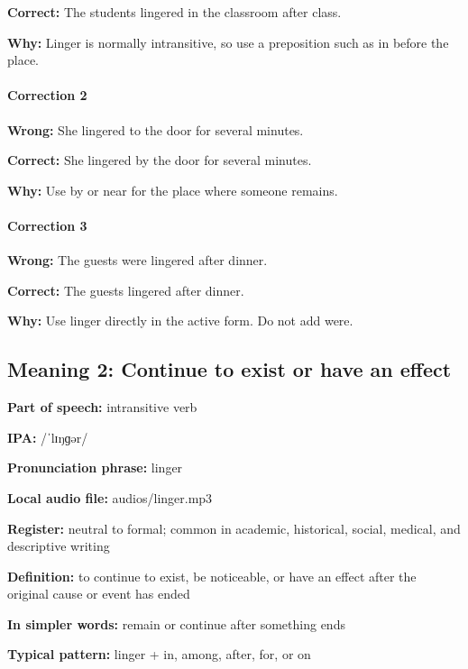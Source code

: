 \documentclass[11pt]{article}
\begin{document}
\textbf{Correct:} The students lingered in the classroom after class.

\textbf{Why:} Linger is normally intransitive, so use a preposition such as in before the place.

\paragraph{Correction 2}
\textbf{Wrong:} She lingered to the door for several minutes.

\textbf{Correct:} She lingered by the door for several minutes.

\textbf{Why:} Use by or near for the place where someone remains.

\paragraph{Correction 3}
\textbf{Wrong:} The guests were lingered after dinner.

\textbf{Correct:} The guests lingered after dinner.

\textbf{Why:} Use linger directly in the active form. Do not add were.

\subsection{Meaning 2: Continue to exist or have an effect}
\textbf{Part of speech:} intransitive verb

\textbf{IPA:} /ˈlɪŋɡər/

\textbf{Pronunciation phrase:} linger

\textbf{Local audio file:} audios/linger.mp3

\textbf{Register:} neutral to formal; common in academic, historical, social, medical, and descriptive writing

\textbf{Definition:} to continue to exist, be noticeable, or have an effect after the original cause or event has ended

\textbf{In simpler words:} remain or continue after something ends

\textbf{Typical pattern:} linger + in, among, after, for, or on
\end{document}
